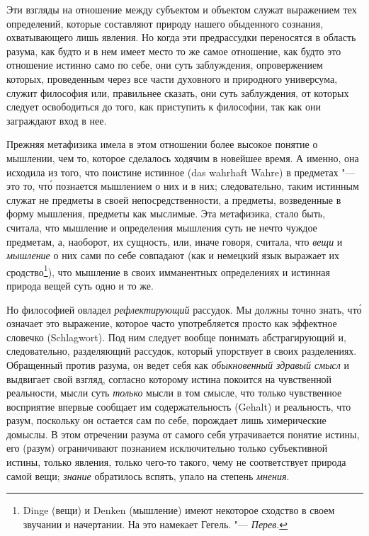 Эти взгляды на отношение между субъектом и объектом служат выражением тех
определений, которые составляют природу нашего обыденного
сознания, охватывающего лишь явления. Но когда эти предрассудки переносятся в область разума, как будто
и в нем имеет место то же самое отношение, как будто это отношение истинно
само по себе,
они суть заблуждения, опровержением которых, проведенным
через все части духовного и природного универсума, служит философия или,
правильнее сказать, они суть заблуждения, от которых следует
освободиться до того, как приступить к философии, так как они заграждают
вход в нее.

Прежняя метафизика имела в этом отношении более высокое понятие о мышлении,
чем то, которое сделалось ходячим в новейшее время. А именно, она исходила из
того, что поистине истинное (das wahrhaft Wahre) в предметах "--- это то, чт\'{о} познается
мышлением о них и в них;
следовательно, таким истинным служат не предметы в своей
непосредственности, а предметы, возведенные в форму мышления,
предметы как мыслимые. Эта метафизика, стало быть, считала, что мышление и
определения мышления суть не нечто чуждое предметам, а, наоборот, их
сущность, или, иначе говоря, считала, что {\em вещи} и
{\em мышление} о них сами по себе совпадают (как и немецкий
язык выражает их сродство\footnote{Dinge (вещи) и Denken (мышление) имеют
некоторое сходство в своем звучании и начертании. На это намекает
Гегель. "--- {\em Перев}.}), что мышление в своих имманентных определениях
и истинная природа вещей суть одно и то же.

Но философией овладел {\em рефлектирующий} рассудок. Мы
должны точно знать, чт\'{о} означает это выражение, которое часто употребляется
просто как эффектное словечко (Schlagwort). Под ним следует вообще понимать
абстрагирующий и, следовательно, разделяющий рассудок, который упорствует в
своих разделениях. Обращенный против разума, он ведет себя как
{\em обыкновенный здравый смысл} и выдвигает свой
взгляд, согласно которому истина покоится на чувственной реальности, мысли
суть {\em только} мысли в том смысле, что только
чувственное восприятие впервые сообщает им содержательность (Gehalt) и
реальность, что разум, поскольку он остается сам по себе, порождает лишь
химерические домыслы.
В этом отречении разума от самого себя утрачивается понятие истины, его
(разум) ограничивают познанием исключительно только субъективной истины,
только явления, только чего-то такого, чему не соответствует природа самой
вещи; {\em знание} обратилось вспять, упало на степень {\em мнения}.

